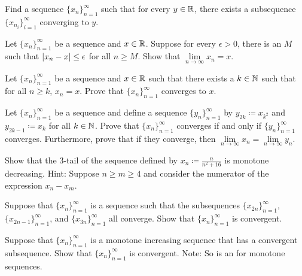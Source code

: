 \begin{exercise}[Tricky]
Find a sequence $\{ x_n \}_{n=1}^\infty$ such that for every $y \in {\mathbb{R}}$, there exists a
subsequence $\{ x_{n_i} \}_{i=1}^\infty$ converging to $y$.
\end{exercise}

\begin{exercise}[Easy]
Let $\{ x_n \}_{n=1}^\infty$ be a sequence and $x \in {\mathbb{R}}$.
Suppose for every $\epsilon > 0$, there is an $M$ such that
$\lvert {x_n-x} \rvert \leq \epsilon$ for all $n \geq M$.
Show that $\lim\limits_{n\to\infty} x_n = x$.
\end{exercise}

\begin{exercise}[Easy]
Let $\{ x_n \}_{n=1}^\infty$ be a sequence and $x \in {\mathbb{R}}$ such that
there exists a $k \in {\mathbb{N}}$ such that for all $n \geq k$,
$x_n = x$.  Prove that $\{ x_n \}_{n=1}^\infty$ converges to $x$.
\end{exercise}

\begin{exercise}
Let $\{ x_n \}_{n=1}^\infty$ be a sequence and
define a sequence $\{ y_n \}_{n=1}^\infty$ by
$y_{2k} \coloneqq x_{k^2}$ and $y_{2k-1} \coloneqq x_k$ for all $k \in {\mathbb{N}}$.
Prove that $\{ x_n \}_{n=1}^\infty$ converges if and only if
$\{ y_n \}_{n=1}^\infty$ converges.
Furthermore, prove that if they converge, then
$\lim\limits_{n\to\infty} x_n = \lim\limits_{n\to\infty} y_n$.
\end{exercise}

\begin{exercise}
Show that the 3-tail of the sequence defined by $x_n \coloneqq \frac{n}{n^2+16}$ is
monotone decreasing.  Hint: Suppose $n \geq m \geq 4$ and consider the 
numerator of the expression $x_n-x_m$.
\end{exercise}

\begin{exercise}
Suppose that $\{ x_n \}_{n=1}^\infty$ is a sequence such that
the subsequences $\{ x_{2n} \}_{n=1}^\infty$, $\{ x_{2n-1} \}_{n=1}^\infty$, and
$\{ x_{3n} \}_{n=1}^\infty$ all converge.  Show that $\{ x_n \}_{n=1}^\infty$ is convergent.
\end{exercise}

\begin{exercise}
Suppose that $\{ x_n \}_{n=1}^\infty$ is a monotone increasing sequence that
has a convergent subsequence.
Show that $\{ x_n \}_{n=1}^\infty$ is convergent.
Note: So  is an  for monotone sequences.
\end{exercise}

